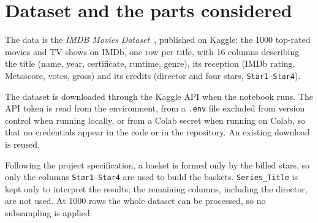 \section{Dataset and the parts considered}
\label{sec:dataset}

The data is the \emph{IMDB Movies Dataset}~\cite{imdbdataset}, published on Kaggle: the 1000 top-rated movies and TV shows on IMDb, one row per title, with 16 columns describing the title (name, year, certificate, runtime, genre), its reception (IMDb rating, Metascore, votes, gross) and its credits (director and four stars, \texttt{Star1}--\texttt{Star4}).

The dataset is downloaded through the Kaggle API when the notebook runs. The API token is read from the environment, from a \texttt{.env} file excluded from version control when running locally, or from a Colab secret when running on Colab, so that no credentials appear in the code or in the repository. An existing download is reused.

Following the project specification, a basket is formed only by the billed stars, so only the columns \texttt{Star1}--\texttt{Star4} are used to build the baskets. \texttt{Series\_Title} is kept only to interpret the results; the remaining columns, including the director, are not used. At 1000 rows the whole dataset can be processed, so no subsampling is applied.
